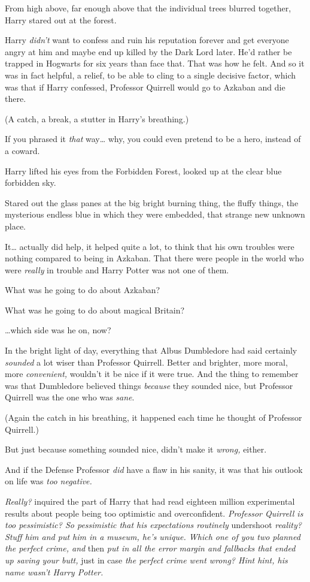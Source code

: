 From high above, far enough above that the individual trees blurred together, 
Harry stared out at the forest.

Harry \emph{didn't} want to confess and ruin his reputation forever and get 
everyone angry at him and maybe end up killed by the Dark Lord later. He'd 
rather be trapped in Hogwarts for six years than face that. That was how he 
felt. And so it was in fact helpful, a relief, to be able to cling to a single 
decisive factor, which was that if Harry confessed, Professor Quirrell would go 
to Azkaban and die there.

(A catch, a break, a stutter in Harry's breathing.)

If you phrased it \emph{that} way{\ldots} why, you could even pretend to be a 
hero, instead of a coward.

Harry lifted his eyes from the Forbidden Forest, looked up at the clear blue 
forbidden sky.

Stared out the glass panes at the big bright burning thing, the fluffy things, 
the mysterious endless blue in which they were embedded, that strange new 
unknown place.

It{\ldots} actually did help, it helped quite a lot, to think that his own 
troubles were nothing compared to being in Azkaban. That there were people in 
the world who were \emph{really} in trouble and Harry Potter was not one of 
them.

What was he going to do about Azkaban?

What was he going to do about magical Britain?

{\ldots}which side was he on, now?

In the bright light of day, everything that Albus Dumbledore had said certainly 
\emph{sounded} a lot wiser than Professor Quirrell. Better and brighter, more 
moral, more \emph{convenient,} wouldn't it be nice if it were true. And the 
thing to remember was that Dumbledore believed things \emph{because} they 
sounded nice, but Professor Quirrell was the one who was \emph{sane}.

(Again the catch in his breathing, it happened each time he thought of 
Professor Quirrell.)

But just because something sounded nice, didn't make it \emph{wrong,} either.

And if the Defense Professor \emph{did} have a flaw in his sanity, it was that 
his outlook on life was \emph{too negative.}

\emph{Really?} inquired the part of Harry that had read eighteen million 
experimental results about people being too optimistic and overconfident. 
\emph{Professor Quirrell is too pessimistic? So pessimistic that his 
expectations routinely} undershoot\emph{ reality? Stuff him and put him in a 
museum, he's unique. Which one of you two planned the perfect crime, and} 
then\emph{ put in all the error margin and fallbacks that ended up saving your 
butt,} just in case\emph{ the perfect crime went wrong? Hint hint, his name 
wasn't Harry Potter.}

